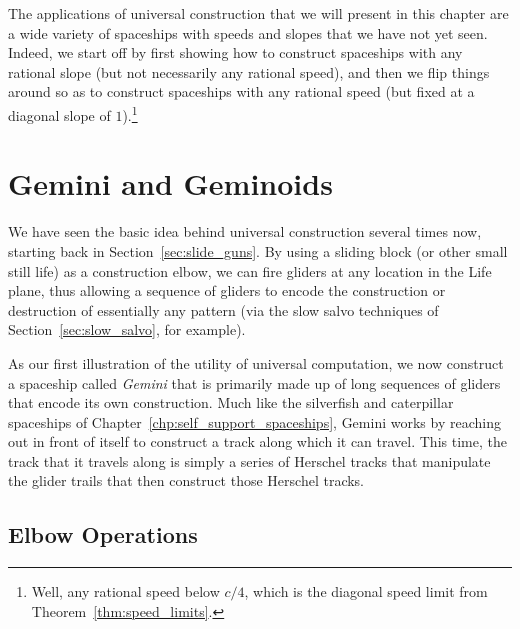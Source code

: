 The applications of universal construction that we will present in this chapter are a wide variety of spaceships with speeds and slopes that we have not yet seen. Indeed, we start off by first showing how to construct spaceships with any rational slope (but not necessarily any rational speed), and then we flip things around so as to construct spaceships with any rational speed (but fixed at a diagonal slope of $1$).\footnote{Well, any rational speed below $c/4$, which is the diagonal speed limit from Theorem~\ref{thm:speed_limits}.}


\section{Gemini and Geminoids}\label{sec:gemini}

We have seen the basic idea behind universal construction several times now, starting back in Section~\ref{sec:slide_guns}. By using a sliding block (or other small still life) as a construction elbow, we can fire gliders at any location in the Life plane, thus allowing a sequence of gliders to encode the construction or destruction of essentially any pattern (via the slow salvo techniques of Section~\ref{sec:slow_salvo}, for example).

As our first illustration of the utility of universal computation, we now construct a spaceship called \emph{Gemini} that is primarily made up of long sequences of gliders that encode its own construction. Much like the silverfish and caterpillar spaceships of Chapter~\ref{chp:self_support_spaceships}, Gemini works by reaching out in front of itself to construct a track along which it can travel. This time, the track that it travels along is simply a series of Herschel tracks that manipulate the glider trails that then construct those Herschel tracks.


\subsection{Elbow Operations}\label{sec:gemini_elbow}

